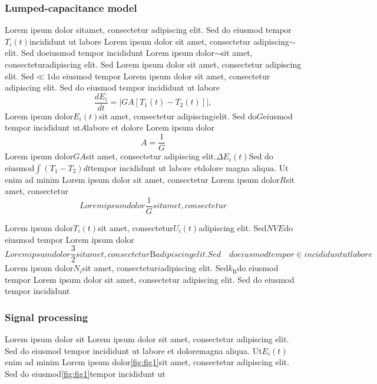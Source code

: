 \documentclass{article}
\begin{document}
\subsubsection*{Lumped-capacitance model}
Lorem ipsum dolor sit\cite{example2024}amet, consectetur adipiscing elit. Sed do eiusmod tempor$T_i(t)$incididunt ut labore
Lorem ipsum dolor sit amet, consectetur adipiscing$\sim$elit. Sed doeiusmod tempor incididunt
Lorem ipsum dolor$\sim$sit amet, consecteturadipiscing elit. Sed
Lorem ipsum dolor sit amet, consectetur adipiscing elit. Sed$\ll 1$do eiusmod tempor
Lorem ipsum dolor sit amet, consectetur adipiscing elit. Sed do eiusmod tempor incididunt ut labore
\begin{equation}
\frac{dE_i}{dt} = \left|G A \left[T_1(t) - T_2(t)\right]\right|, 
\end{equation}
Lorem ipsum dolor$E_i(t)$sit amet, consectetur adipiscing$i$elit. Sed do$G$eiusmod tempor incididunt ut$A$labore et dolore
Lorem ipsum dolor
\begin{equation}
A = \frac{1}{G}
\end{equation}
Lorem ipsum dolor$G A$sit amet, consectetur adipiscing elit.$\Delta E_i(t)$Sed do eiusmod$\int (T_1 - T_2)dt$tempor incididunt ut labore et\cite{example2024}dolore magna aliqua. Ut enim ad minim
Lorem ipsum dolor sit amet, consectetur
Lorem ipsum dolor$R$sit amet, consectetur
\begin{equation}
    Lorem ipsum dolor\frac{1}{G}sit amet, consectetur
\end{equation}

Lorem ipsum dolor$T_i(t)$sit amet, consectetur$U_i(t)$adipiscing elit. Sed$NVE$do eiusmod tempor
Lorem ipsum dolor
\begin{equation}
Lorem ipsum dolor\frac{3}{2}sit amet, consectetur\mathrm{B}adipiscing elit. Sed\quad do eiusmod tempor\in incididunt ut labore
\label{eq:layer_energy}
\end{equation}
Lorem ipsum dolor$N_i$sit amet, consectetur$i$adipiscing elit. Sed$k_{\mathrm{B}}$do eiusmod tempor
Lorem ipsum dolor sit amet, consectetur adipiscing elit. Sed do eiusmod tempor incididunt

\subsubsection*{Signal processing}
Lorem ipsum dolor sit
Lorem ipsum dolor sit amet, consectetur adipiscing elit. Sed do eiusmod tempor incididunt ut labore et dolore\cite{example2024}magna aliqua. Ut$E_i(t)$enim ad minim
Lorem ipsum dolor\ref{fig:fig1}sit amet, consectetur adipiscing elit. Sed do eiusmod\ref{fig:fig1}tempor incididunt ut
\end{document}
